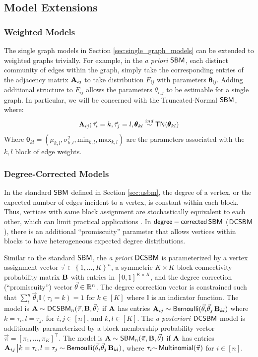 \subsection{Model Extensions}\label{sec:model_extensions}
\subsubsection{Weighted Models}
The single graph models in Section \ref{sec:single_graph_models} can be extended to weighted graphs trivially. For example, in the \textit{a priori} $\operatorname{\mathsf{SBM}}$, each distinct community of edges within the graph, simply take the corresponding entries of the adjacency matrix $\operatorname{\mathbf{A}}_{ij}$ to take distribution $F_{ij}$ with parameters $\pmb \theta_{ij}$. Adding additional structure to $F_{ij}$ allows the parameters $\theta_{i,j}$ to be estimable for a single graph. In particular, we will be concerned with the Truncated-Normal $\operatorname{\mathsf{SBM}}$, where:
\begin{align*}
    \operatorname{\mathbf{A}}_{ij}; \vec\tau_i = k, \vec\tau_j = l, \pmb \theta_{kl} \overset{ind}{\sim} \operatorname{\mathsf{TN}} (\pmb \theta_{kl})
\end{align*}
Where $\pmb \theta_{kl} = (\mu_{k,l}, \sigma^2_{k,l}, \textrm{min}_{k,l}, \textrm{max}_{k,l})$ are the parameters associated with the $k, l$ block of edge weights.

\subsubsection{Degree-Corrected Models}
In the standard $\operatorname{\mathsf{SBM}}$ defined in Section \ref{sec:usbm}, the degree of a vertex, or the expected number of edges incident to a vertex, is constant within each block. Thus, vertices with same block assignment are stochastically equivalent to each other, which can limit practical applications \cite{karrer2011stochastic}. 
In $\mathsf{degree-corrected} \operatorname{\mathsf{SBM}}$ ($\operatorname{\mathsf{DCSBM}}$),  there is an additional ``promiscuity'' parameter that allows vertices within blocks to have heterogeneous expected degree distributions. 

Similar to the standard $\operatorname{\mathsf{SBM}}$, the \textit{a priori} $\operatorname{\mathsf{DCSBM}}$ is parameterized by a vertex assignment vector $\vec \tau \in \left\{1, \hdots, K\right\}^n$, a symmetric $K \times K$ block connectivity probability matrix $\operatorname{\mathbf{B}}$ with entries in $[0,1]^{K \times K}$, and the degree correction (``promiscuity'') vector $\vec \theta \in\mathbb{R}^n$. 
The degree correction vector is constrained such that $\sum_i^n \vec \theta_i \mathbb{I} (\tau_i=k)=1$ for $k\in[K]$ where $\mathbb{I}$ is an indicator function. 
The model is $\operatorname{\mathbf{A}}\sim\operatorname{\mathsf{DCSBM}}_n(\vec\tau, \operatorname{\mathbf{B}}, \vec \theta)$ if $\operatorname{\mathbf{A}}$ has entries $\operatorname{\mathbf{A}}_{ij} \sim \operatorname{\mathsf{Bernoulli}}(\vec\theta_i \vec\theta_j\operatorname{\mathbf{B}}_{kl})$ where $k=\tau_i , l=\tau_j$, for $i, j \in [n]$, and $k, l \in [K]$. 
The \textit{a posteriori} $\operatorname{\mathsf{DCSBM}}$ model is additionally parameterized by a block membership probability vector $\vec{\pi} = [\pi_1,\dots,\pi_K]^\top$. The model is $\operatorname{\mathbf{A}} \sim \operatorname{\mathsf{SBM}}_n(\vec \pi,\operatorname{\mathbf{B}}, \vec \theta)$ if $\operatorname{\mathbf{A}}$ has entries $\operatorname{\mathbf{A}}_{ij} \big | k=\tau_i, l=\tau_j \sim \operatorname{\mathsf{Bernoulli}}(\vec\theta_i \vec\theta_j\operatorname{\mathbf{B}}_{kl})$, where $\tau_i {\sim} \operatorname{\mathsf{Multinomial}}(\vec \pi)$ for $i \in [n]$. 

